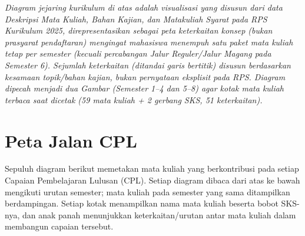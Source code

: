 \vspace{2mm}

\textit{Diagram jejaring kurikulum di atas adalah visualisasi yang disusun dari data Deskripsi Mata Kuliah, Bahan Kajian, dan Matakuliah Syarat pada RPS Kurikulum 2025, direpresentasikan sebagai peta keterkaitan konsep (bukan prasyarat pendaftaran) mengingat mahasiswa menempuh satu paket mata kuliah tetap per semester (kecuali percabangan Jalur Reguler/Jalur Magang pada Semester 6). Sejumlah keterkaitan (ditandai garis bertitik) disusun berdasarkan kesamaan topik/bahan kajian, bukan pernyataan eksplisit pada RPS. Diagram dipecah menjadi dua Gambar (Semester 1--4 dan 5--8) agar kotak mata kuliah terbaca saat dicetak (59 mata kuliah + 2 gerbang SKS, 51 keterkaitan).}

\section{Peta Jalan CPL}

Sepuluh diagram berikut memetakan mata kuliah yang berkontribusi pada setiap Capaian Pembelajaran Lulusan (CPL). Setiap diagram dibaca dari atas ke bawah mengikuti urutan semester; mata kuliah pada semester yang sama ditampilkan berdampingan. Setiap kotak menampilkan nama mata kuliah beserta bobot SKS-nya, dan anak panah menunjukkan keterkaitan/urutan antar mata kuliah dalam membangun capaian tersebut.

